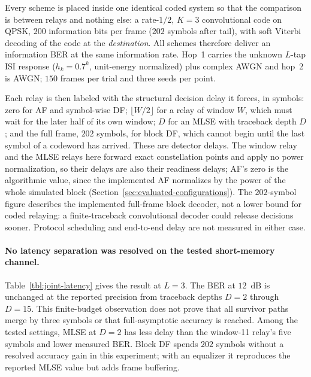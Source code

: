 Every scheme is placed inside one identical coded system so that the comparison is between relays and nothing else: a rate-$1/2$, $K=3$ convolutional code on QPSK, $200$ information bits per frame ($202$ symbols after tail), with soft Viterbi decoding of the code at the \emph{destination}. All schemes therefore deliver an information BER at the same information rate. Hop~1 carries the unknown $L$-tap ISI response ($h_k = 0.7^k$, unit-energy normalized) plus complex AWGN and hop~2 is AWGN; $150$ frames per trial and three seeds per point.

Each relay is then labeled with the structural decision delay it forces, in symbols: zero for AF and symbol-wise DF; $\lfloor W/2 \rfloor$ for a relay of window $W$, which must wait for the later half of its own window; $D$ for an MLSE with traceback depth $D$; and the full frame, $202$ symbols, for block DF, which cannot begin until the last symbol of a codeword has arrived. These are detector delays. The window relay and the MLSE relays here forward exact constellation points and apply no power normalization, so their delays are also their readiness delays; AF's zero is the algorithmic value, since the implemented AF normalizes by the power of the whole simulated block (Section~\ref{sec:evaluated-configurations}). The $202$-symbol figure describes the implemented full-frame block decoder, not a lower bound for coded relaying: a finite-traceback convolutional decoder could release decisions sooner. Protocol scheduling and end-to-end delay are not measured in either case.

\paragraph{No latency separation was resolved on the tested short-memory channel.} Table~\ref{tbl:joint-latency} gives the result at $L=3$. The BER at $12$~dB is unchanged at the reported precision from traceback depths $D=2$ through $D=15$. This finite-budget observation does not prove that all survivor paths merge by three symbols or that full-asymptotic accuracy is reached. Among the tested settings, MLSE at $D=2$ has less delay than the window-11 relay's five symbols and lower measured BER. Block DF spends $202$ symbols without a resolved accuracy gain in this experiment; with an equalizer it reproduces the reported MLSE value but adds frame buffering.

